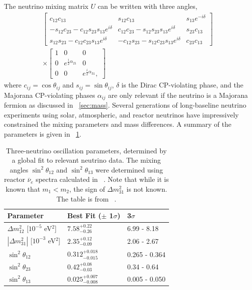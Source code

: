 The neutrino mixing matrix $U$ can be written with three angles,
\begin{multline}
\begin{bmatrix}
c_{12}c_{13} & s_{12}c_{13} & s_{13}e^{-i\delta} \\
-s_{12}c_{23}-c_{12}s_{23}s_{13}e^{i\delta} & c_{12}c_{23}-s_{12}s_{23}s_{13}e^{i\delta} & s_{23}c_{13} \\
s_{12}s_{23}-c_{12}c_{23}s_{13}e^{i\delta} & -c_{12}s_{23}-s_{12}c_{23}s_{13}e^{i\delta} & c_{23}c_{13} 
\end{bmatrix} 
\\
\times 
\begin{bmatrix}
1 & 0 & 0 \\
0 & e^{\frac{i}{2}\alpha_{21}} & 0 \\
0 & 0 & e^{\frac{i}{2}\alpha_{31}},
\end{bmatrix}
\end{multline}
where $c_{ij} = \cos{\theta_{ij}}$ and $s_{ij} = \sin{\theta_{ij}}$, $\delta$ is the Dirac CP-violating phase, and the Majorana CP-violating phases $\alpha_{ij}$ are only relevant if the neutrino is a Majorana fermion as discussed in {\sect}~\ref{sec:mass}.  Several generations of long-baseline neutrino experiments using solar, atmospheric, and reactor neutrinos have impressively constrained the mixing parameters and mass differences.  A summary of the parameters is given in {\tab}~\ref{tab:neutrinoParameters}.
\begin{table}
\centering
\begin{tabular}{lll}\toprule
Parameter & Best Fit ($\pm$ 1$\sigma$) & 3$\sigma$ \\
\midrule
${\Delta}m^2_{12}$ [$10^{-5}$ eV$^2$] & $7.58^{+0.22}_{-0.26}$ & 6.99 - 8.18 \\
$|{\Delta}m^2_{31}|$ [$10^{-3}$ eV$^2$] & $2.35^{+0.12}_{-0.09}$ & 2.06 - 2.67 \\
$\sin^2{\theta_{12}}$ & $0.312^{+0.018}_{-0.015}$ & 0.265 - 0.364 \\  
$\sin^2{\theta_{23}}$ & $0.42^{+0.08}_{-0.03}$ & 0.34 - 0.64 \\  
$\sin^2{\theta_{13}}$ & $0.025^{+0.007}_{-0.008}$ & 0.005 - 0.050 \\   
\bottomrule  
\end{tabular}
\caption{Three-neutrino oscillation parameters, determined by a global fit to relevant neutrino data.   The mixing angles $\sin^2{\theta_{12}}$ and $\sin^2{\theta_{13}}$ were determined using reactor $\overline{\nu}_e$ spectra calculated in {}~\cite{reactorNeutrinoSpectrum}.  Note that while it is known that $m_1 < m_2$, the sign of ${\Delta}m^2_{31}$ is not known.  The table is from {}~\cite{PDG}.}
\label{tab:neutrinoParameters}
\end{table}
